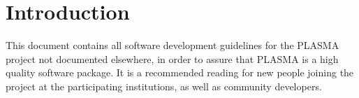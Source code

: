 
\chapter{Introduction}
\setcounter{page}{1}

This document contains all software development guidelines for the PLASMA project not documented
elsewhere, in order to assure that PLASMA is a high quality software package.
It is a recommended reading for new people joining the project at the participating institutions,
as well as community developers.

